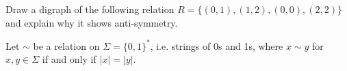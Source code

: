 \documentclass[addpoints]{exam}
\begin{document}
\begin{questions}
\question[4] 
Draw a digraph of  the following relation 
$R= \{(0,1),(1,2), (0,0), (2,2)\}$ 
and explain why it shows anti-symmetry.

\vspace{60mm}


\question Let $\sim$ be a relation on $\Sigma = \{0,1\}^*$, i.e. strings of 0s and 1s, where $x\sim y$ for $x,y \in
\Sigma$ if and only if $|x| = |y|$. 

\vspace{80mm}








\end{questions}
\end{document}
